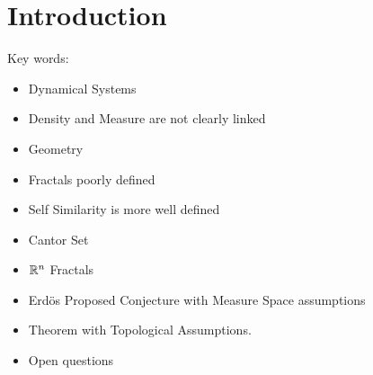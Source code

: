 \chapter{Introduction}

Key words:\begin{itemize}
    \item Dynamical Systems
    \item Density and Measure are not clearly linked
    \item Geometry
    \item Fractals poorly defined
    \item Self Similarity is more well defined
    \item Cantor Set
    \item $\mathbb{R}^n$ Fractals
    \item Erd\"{o}s Proposed Conjecture with Measure Space assumptions
    \item Theorem with Topological Assumptions.
    \item Open questions
\end{itemize}






